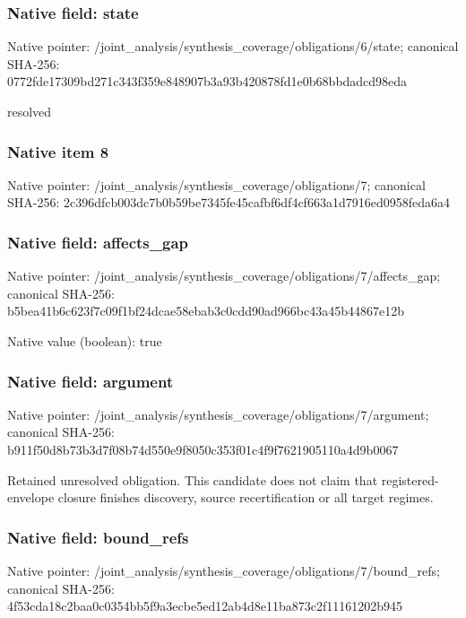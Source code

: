 \documentclass[10pt,a4paper]{article}
\begin{document}
\subsubsection{Native field: state}
Native pointer: /joint\_\allowbreak{}analysis/synthesis\_\allowbreak{}coverage/obligations/6/state; canonical SHA-256: 0772fde17309bd271c343f359e848907b3a93b420878fd1e0b68bbdadcd98eda

\begingroup\raggedright\sloppy resolved\par\endgroup

\subsubsection{Native item 8}
Native pointer: /joint\_\allowbreak{}analysis/synthesis\_\allowbreak{}coverage/obligations/7; canonical SHA-256: 2c396dfcb003dc7b0b59be7345fe45cafbf6df4cf663a1d7916ed0958feda6a4

\subsubsection{Native field: affects\_\allowbreak{}gap}
Native pointer: /joint\_\allowbreak{}analysis/synthesis\_\allowbreak{}coverage/obligations/7/affects\_\allowbreak{}gap; canonical SHA-256: b5bea41b6c623f7c09f1bf24dcae58ebab3c0cdd90ad966bc43a45b44867e12b

Native value (boolean): true

\subsubsection{Native field: argument}
Native pointer: /joint\_\allowbreak{}analysis/synthesis\_\allowbreak{}coverage/obligations/7/argument; canonical SHA-256: b911f50d8b73b3d7f08b74d550e9f8050c353f01c4f9f7621905110a4d9b0067

\begingroup\raggedright\sloppy Retained unresolved obligation. This candidate does not claim that registered-envelope closure finishes discovery,\allowbreak{} source recertification or all target regimes.\par\endgroup

\subsubsection{Native field: bound\_\allowbreak{}refs}
Native pointer: /joint\_\allowbreak{}analysis/synthesis\_\allowbreak{}coverage/obligations/7/bound\_\allowbreak{}refs; canonical SHA-256: 4f53cda18c2baa0c0354bb5f9a3ecbe5ed12ab4d8e11ba873c2f11161202b945
\end{document}
